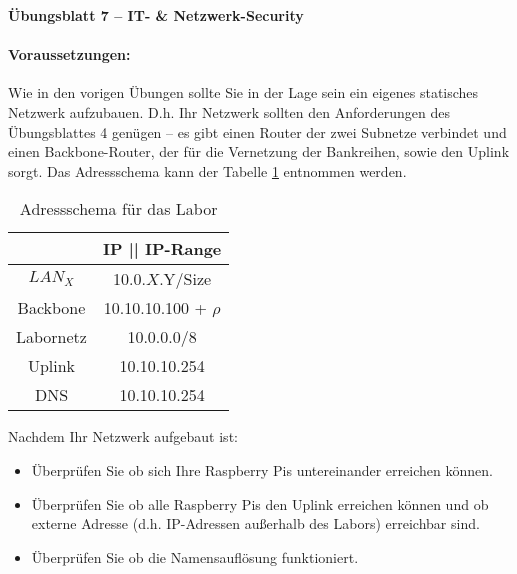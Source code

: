 \documentclass[paper=a4,fontsize=11pt]{scrartcl}%
\numberwithin{equation}{section}
\begin{document}
\begin{center}
\Large{\textbf{Übungsblatt 7 -- IT- \& Netzwerk-Security}}
\end{center}
\paragraph{Voraussetzungen:}
Wie in den vorigen Übungen sollte Sie in der Lage sein ein eigenes statisches Netzwerk aufzubauen. D.h. Ihr Netzwerk sollten den Anforderungen des Übungsblattes 4 genügen -- es gibt einen Router der zwei Subnetze verbindet und einen Backbone-Router, der für die Vernetzung der Bankreihen, sowie den Uplink sorgt. Das Adressschema kann der Tabelle \ref{adress_scheme} entnommen werden.
\begin{table}[H]
\caption{Adressschema für das Labor}
\label{adress_scheme}
\centering
\begin{tabular}{|c|c|}\hline
 & \textbf{IP  || IP-Range} \\ \hline
 $LAN_X$ & 10.0.$X$.Y/Size \\ \hline
 Backbone & 10.10.10.100 + $\rho$ \\ \hline
 Labornetz & 10.0.0.0/8 \\ \hline
 Uplink & 10.10.10.254 \\ \hline
 DNS & 10.10.10.254 \\ \hline
\end{tabular}
\end{table} 
Nachdem Ihr Netzwerk aufgebaut ist:
\begin{itemize}
	\item Überprüfen Sie ob sich Ihre Raspberry Pis untereinander erreichen können.
	\item Überprüfen Sie ob alle Raspberry Pis den Uplink erreichen können und ob externe Adresse (d.h. IP-Adressen außerhalb des Labors) erreichbar sind.
	\item Überprüfen Sie ob die Namensauflösung funktioniert.
\end{itemize}
\end{document}

